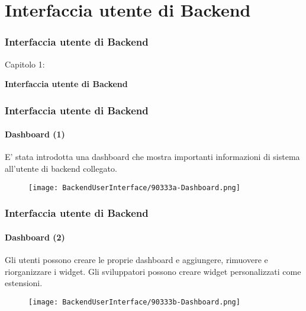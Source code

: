 %

\section{Interfaccia utente di Backend}
\begin{frame}[fragile]
	\frametitle{Interfaccia utente di Backend}

	\begin{center}\huge{Capitolo 1:}\end{center}
	\begin{center}\huge{\color{typo3darkgrey}\textbf{Interfaccia utente di Backend}}\end{center}

\end{frame}


\begin{frame}[fragile]
	\frametitle{Interfaccia utente di Backend}
	\framesubtitle{Dashboard (1)}

	E' stata introdotta una dashboard che mostra importanti informazioni di sistema all'utente di backend collegato.

	\begin{figure}
		\texttt{[image: BackendUserInterface/90333a-Dashboard.png]}
	\end{figure}

\end{frame}


\begin{frame}[fragile]
	\frametitle{Interfaccia utente di Backend}
	\framesubtitle{Dashboard (2)}

	Gli utenti possono creare le proprie dashboard e aggiungere, rimuovere e riorganizzare i widget.
	Gli sviluppatori possono creare widget personalizzati come estensioni.

	\begin{figure}
		\texttt{[image: BackendUserInterface/90333b-Dashboard.png]}
	\end{figure}

\end{frame}

